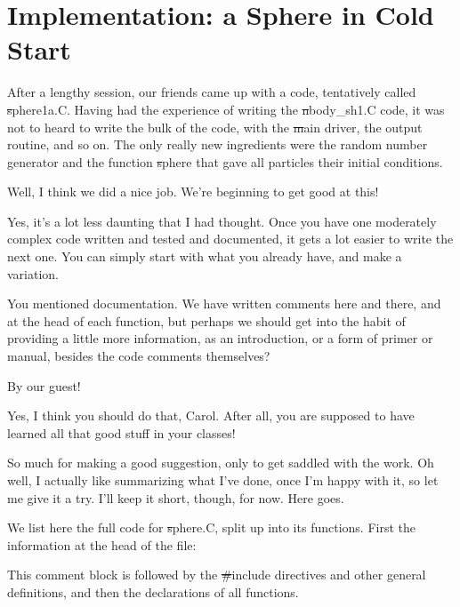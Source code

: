 \cba

\section{Implementation: a Sphere in Cold Start}

After a lengthy session, our friends came up with a code, tentatively
called {\st sphere1a.C}.  Having had the experience of writing the
{\st nbody\_sh1.C} code, it was not to heard to write the bulk of the
code, with the {\st main} driver, the output routine, and so on.  The
only really new ingredients were the random number generator and the
function {\st sphere} that gave all particles their initial conditions.

\abc

\alice
Well, I think we did a nice job.  We're beginning to get good at this!

\bob
Yes, it's a lot less daunting that I had thought.  Once you have one
moderately complex code written and tested and documented, it gets a
lot easier to write the next one.  You can simply start with what you
already have, and make a variation.

\carol
You mentioned documentation.  We have written comments here and there,
and at the head of each function, but perhaps we should get into the
habit of providing a little more information, as an introduction, or a
form of primer or manual, besides the code comments themselves?

\bob
By our guest!

\alice
Yes, I think you should do that, Carol.  After all, you are supposed
to have learned all that good stuff in your classes!

\carol
So much for making a good suggestion, only to get saddled with the work.
Oh well, I actually like summarizing what I've done, once I'm happy with
it, so let me give it a try.  I'll keep it short, though, for now.
Here goes.

\cba

We list here the full code for {\st sphere.C}, split up into its
functions.  First the information at the head of the file:


This comment block is followed by the {\st \#include} directives and
other general definitions, and then the declarations of all functions.


